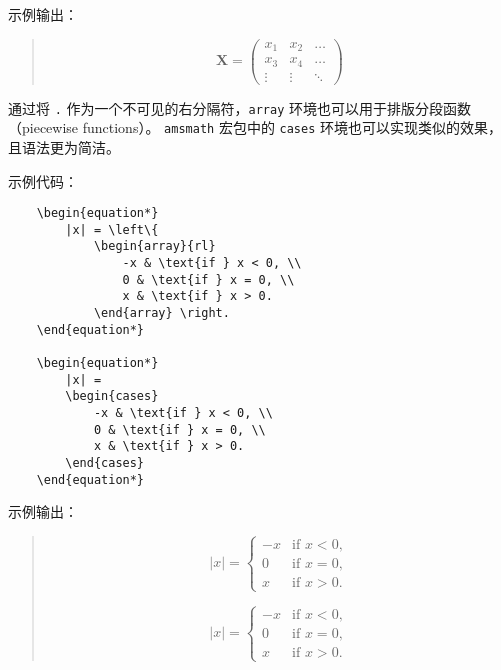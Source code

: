 \documentclass[UTF8]{ctexart}
\begin{document}
示例输出：
\begin{quote}
    \begin{equation*}
        \mathbf{X} = \left(
            \begin{array}{ccc}
                x_1 & x_2 & \ldots \\
                x_3 & x_4 & \ldots \\
                \vdots & \vdots & \ddots
            \end{array} \right)
    \end{equation*}
\end{quote}

通过将 \texttt{.} 作为一个不可见的右分隔符，\texttt{array} 环境也可以用于排版分段函数（piecewise functions）。
\texttt{amsmath} 宏包中的 \texttt{cases} 环境也可以实现类似的效果，且语法更为简洁。

示例代码：
\begin{verbatim}
    \begin{equation*}
        |x| = \left\{
            \begin{array}{rl}
                -x & \text{if } x < 0, \\
                0 & \text{if } x = 0, \\
                x & \text{if } x > 0.
            \end{array} \right.
    \end{equation*}

    \begin{equation*}
        |x| =
        \begin{cases}
            -x & \text{if } x < 0, \\
            0 & \text{if } x = 0, \\
            x & \text{if } x > 0.
        \end{cases}
    \end{equation*}
\end{verbatim}

示例输出：
\begin{quote}
    \begin{equation*}
        |x| = \left\{
            \begin{array}{rl}
                -x & \text{if } x < 0, \\
                0 & \text{if } x = 0, \\
                x & \text{if } x > 0.
            \end{array} \right.
    \end{equation*}

    \begin{equation*}
        |x| =
        \begin{cases}
            -x & \text{if } x < 0, \\
            0 & \text{if } x = 0, \\
            x & \text{if } x > 0.
        \end{cases}
    \end{equation*}
\end{quote}
\end{document}
